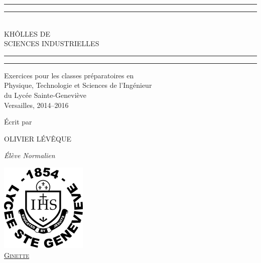 \begingroup 
\centering
\scshape

\vspace*{2cm}
\rule{\textwidth}{1.6pt}\vspace*{-\baselineskip}\vspace*{1mm}
\rule{\textwidth}{0.4pt}\\[\baselineskip]

{\LARGE KHÔLLES DE \\[0.3\baselineskip]
SCIENCES INDUSTRIELLES}\\[\baselineskip]

\rule{\textwidth}{0.4pt}\vspace*{-\baselineskip}\vspace*{1.4mm}
\rule{\textwidth}{1.6pt}\vspace*{2cm}

Exercices pour les classes préparatoires en \\
Physique, Technologie et Sciences de l'Ing\'enieur \\
du Lycée Sainte-Geneviève \\[\baselineskip]
Versailles,  2014--2016\par

\vspace*{2\baselineskip}

Écrit par\\[\baselineskip]
{\Large OLIVIER LÉVÊQUE\par}
{\itshape Élève Normalien\par}

\vfill
\href{http://wwww.bginette.com}{\includegraphics[scale=0.3]{png/logo.png}}\\
\href{http://wwww.bginette.com}{{\scshape Ginette}} \\[0.3\baselineskip] %

\endgroup
